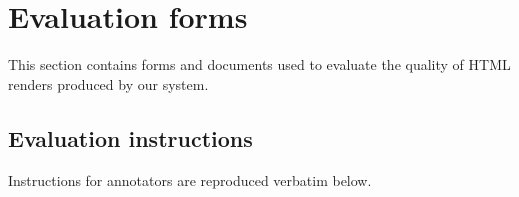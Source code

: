 \appendix

\section{Evaluation forms}

This section contains forms and documents used to evaluate the quality of HTML renders produced by our system.

\subsection{Evaluation instructions}
\label{app:eval_instructions}

Instructions for annotators are reproduced verbatim below.


